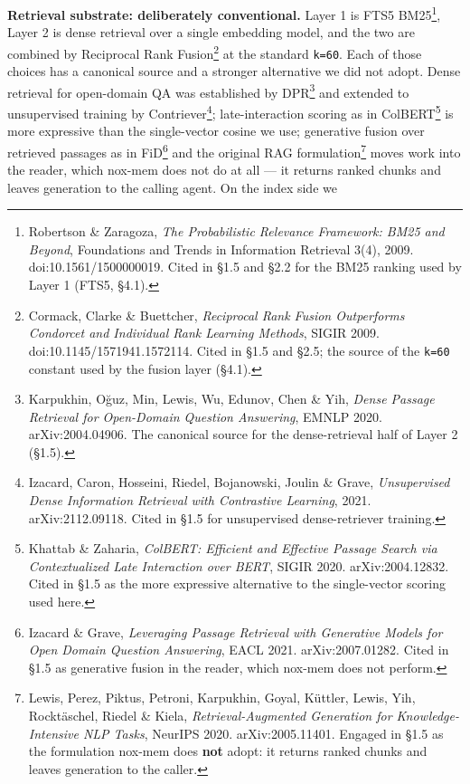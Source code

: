\documentclass[
]{article}
\begin{document}
\textbf{Retrieval substrate: deliberately conventional.} Layer 1 is FTS5
BM25\footnote{Robertson \& Zaragoza, \emph{The Probabilistic Relevance
  Framework: BM25 and Beyond}, Foundations and Trends in Information
  Retrieval 3(4), 2009. doi:10.1561/1500000019. Cited in §1.5 and §2.2
  for the BM25 ranking used by Layer 1 (FTS5, §4.1).}, Layer 2 is dense
retrieval over a single embedding model, and the two are combined by
Reciprocal Rank Fusion\footnote{Cormack, Clarke \& Buettcher,
  \emph{Reciprocal Rank Fusion Outperforms Condorcet and Individual Rank
  Learning Methods}, SIGIR 2009. doi:10.1145/1571941.1572114. Cited in
  §1.5 and §2.5; the source of the \texttt{k=60} constant used by the
  fusion layer (§4.1).} at the standard \texttt{k=60}. Each of those
choices has a canonical source and a stronger alternative we did not
adopt. Dense retrieval for open-domain QA was established by
DPR\footnote{Karpukhin, Oğuz, Min, Lewis, Wu, Edunov, Chen \& Yih,
  \emph{Dense Passage Retrieval for Open-Domain Question Answering},
  EMNLP 2020. arXiv:2004.04906. The canonical source for the
  dense-retrieval half of Layer 2 (§1.5).} and extended to unsupervised
training by Contriever\footnote{Izacard, Caron, Hosseini, Riedel,
  Bojanowski, Joulin \& Grave, \emph{Unsupervised Dense Information
  Retrieval with Contrastive Learning}, 2021. arXiv:2112.09118. Cited in
  §1.5 for unsupervised dense-retriever training.}; late-interaction
scoring as in ColBERT\footnote{Khattab \& Zaharia, \emph{ColBERT:
  Efficient and Effective Passage Search via Contextualized Late
  Interaction over BERT}, SIGIR 2020. arXiv:2004.12832. Cited in §1.5 as
  the more expressive alternative to the single-vector scoring used
  here.} is more expressive than the single-vector cosine we use;
generative fusion over retrieved passages as in FiD\footnote{Izacard \&
  Grave, \emph{Leveraging Passage Retrieval with Generative Models for
  Open Domain Question Answering}, EACL 2021. arXiv:2007.01282. Cited in
  §1.5 as generative fusion in the reader, which nox-mem does not
  perform.} and the original RAG formulation\footnote{Lewis, Perez,
  Piktus, Petroni, Karpukhin, Goyal, Küttler, Lewis, Yih, Rocktäschel,
  Riedel \& Kiela, \emph{Retrieval-Augmented Generation for
  Knowledge-Intensive NLP Tasks}, NeurIPS 2020. arXiv:2005.11401.
  Engaged in §1.5 as the formulation nox-mem does \textbf{not} adopt: it
  returns ranked chunks and leaves generation to the caller.} moves work
into the reader, which nox-mem does not do at all --- it returns ranked
chunks and leaves generation to the calling agent. On the index side we
\end{document}
